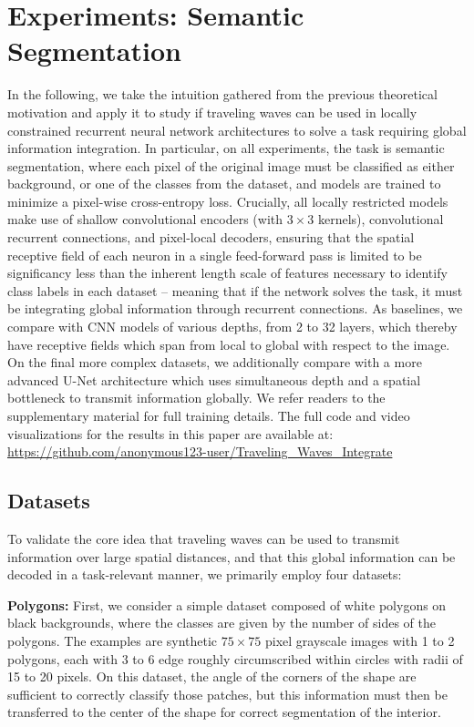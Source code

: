
\section{Experiments: Semantic Segmentation}
In the following, we take the intuition gathered from the previous theoretical motivation and apply it to study if traveling waves can be used in locally constrained recurrent neural network architectures to solve a task requiring global information integration. In particular, on all experiments, the task is semantic segmentation, where each pixel of the original image must be classified as either background, or one of the classes from the dataset, and models are trained to minimize a pixel-wise cross-entropy loss. Crucially, all locally restricted models make use of shallow convolutional encoders (with $3\times3$ kernels), convolutional recurrent connections, and pixel-local decoders, ensuring that the spatial receptive field of each neuron in a single feed-forward pass is limited to be significancy less than the inherent length scale of features necessary to identify class labels in each dataset -- meaning that if the network solves the task, it must be integrating global information through recurrent connections. As baselines, we compare with CNN models of various depths, from 2 to 32 layers, which thereby have receptive fields which span from local to global with respect to the image. On the final more complex datasets, we additionally compare with a more advanced U-Net architecture \citep{ronneberger_u-net_2015} which uses simultaneous depth and a spatial bottleneck to transmit information globally.
We refer readers to the supplementary material for full training details. The full code and video visualizations for the results in this paper are available at: \url{https://github.com/anonymous123-user/Traveling_Waves_Integrate}

\subsection{Datasets}
To validate the core idea that traveling waves can be used to transmit information over large spatial distances, and that this global information can be decoded in a task-relevant manner, we primarily employ four datasets:

\textbf{Polygons:} First, we consider a simple dataset composed of white polygons on black backgrounds, where the classes are given by the number of sides of the polygons. The examples are synthetic $75\times75$ pixel grayscale images with 1 to 2 polygons, each with 3 to 6 edge roughly circumscribed within circles with radii of 15 to 20 pixels. On this dataset, the angle of the corners of the shape are sufficient to correctly classify those patches, but this information must then be transferred to the center of the shape for correct segmentation of the interior.

